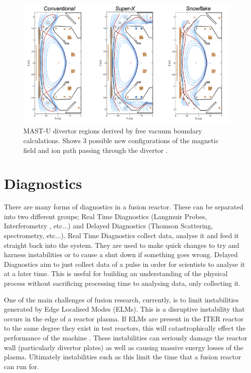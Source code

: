 \documentclass[12pt,a4paper,oneside]{report}
\begin{document}
\begin{figure}[H]
\includegraphics[width=1\textwidth, center,angle=0]{Images/MASTUdivertors}
\caption{MAST-U divertor regions derived by free vacuum boundary calculations. Shows 3 possible new configurations of the magnetic field and ion path passing through the divertor \cite{CulhamCenterforFusionEnergyResearch:Upgrade}.}
\label{mastdivertors}
\end{figure}

	\section{Diagnostics}
There are many forms of diagnostics in a fusion reactor. These can be separated into two different groups; Real Time Diagnostics (Langmuir Probes, Interferometry \cite{Brunner2017}, etc...) and Delayed Diagnostics (Thomson Scattering\cite{Scannell2008DesignMAST}, spectrometry, etc...). Real Time Diagnostics collect data, analyse it and feed it straight back into the system. They are used to make quick changes to try and harness instabilities or to cause a shut down if something goes wrong. Delayed Diagnostics aim to just collect data of a pulse in order for scientists to analyse it at a later time. This is useful for building an understanding of the physical process without sacrificing processing time to analysing data, only collecting it. 
\medskip

One of the main challenges of fusion research, currently, is to limit instabilities generated by Edge Localised Modes (ELMs). This is a disruptive instability that occurs in the edge of a reactor plasma. If ELMs are present in the ITER reactor to the same degree they exist in test reactors, this will catastrophically effect the performance of the machine \cite{Loarte2014ProgressOperation}. These instabilities can seriously damage the reactor wall (particularly divertor plates) as well as causing massive energy losses of the plasma. Ultimately instabilities such as this limit the time that a fusion reactor can run for.
	
\end{document}
